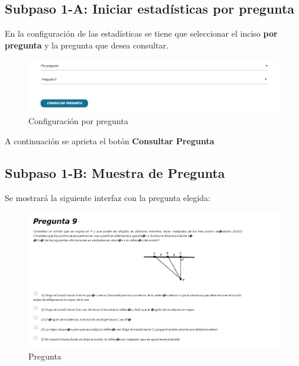 \subsection{Subpaso 1-A: Iniciar estadísticas por pregunta}
	En la configuración de las estadísticas se tiene que seleccionar el 
	inciso \textbf{por pregunta} y la pregunta que desea 
	consultar.
		
	\begin{figure}[hbtp]

	\includegraphics[scale=0.5]{images/Interfaz/IUGS15_configuracioAnos.PNG}
	\caption{Configuración por pregunta }
	\end{figure}
	A continuación se aprieta el botón \textbf{Consultar Pregunta}
	
\subsection{Subpaso 1-B: Muestra de Pregunta}
	Se mostrará la siguiente interfaz con la pregunta elegida:
	\begin{figure}[hbtp]
		\includegraphics[scale=0.5]{images/Interfaz/IUGS15_estadisticasAnos.PNG}
		\caption{Pregunta}
	\end{figure}	
	
